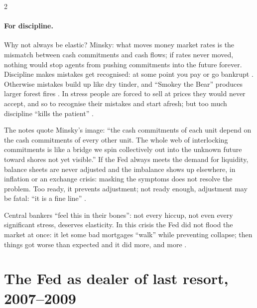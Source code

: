 \begin{paracol}{2}
\paragraph{For discipline.} Why not always be elastic? Minsky: what moves money market rates is the mismatch between cash commitments and cash flows; if rates never moved,
nothing would stop agents from pushing commitments into the future forever. Discipline makes mistakes get recognised: at some point you pay or go bankrupt
. Otherwise mistakes build up like dry tinder, and ``Smokey the Bear'' produces larger forest fires
. In stress people are forced to sell at prices they would never accept, and so to recognise their mistakes and start afresh; but too much discipline ``kills the
patient'' .

The notes quote Minsky's image: ``the cash commitments of each unit depend on the cash commitments of every other unit. The whole web of interlocking commitments is like a bridge we spin
collectively out into the unknown future toward shores not yet visible.'' If the Fed always meets the demand for liquidity, balance sheets are never adjusted and the imbalance shows up
elsewhere, in inflation or an exchange crisis: masking the symptoms does not resolve the problem. Too ready, it prevents adjustment; not ready enough, adjustment may be fatal: ``it is a fine
line'' .

\begin{intuition}
Central bankers ``feel this in their bones'': not every hiccup, not even every significant stress, deserves elasticity. In this crisis the Fed did not flood the market at once:
it let some bad mortgages ``walk'' while preventing collapse; then things got worse than expected and it did more, and more .
\end{intuition}

\section{The Fed as dealer of last resort, 2007--2009}\label{sec:lr-dolr}


\end{paracol}
